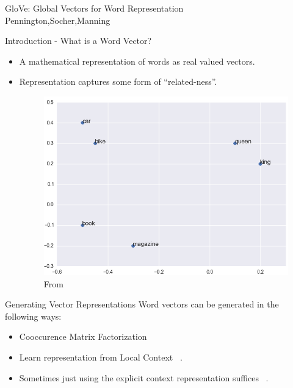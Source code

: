 \begin{frame}
  \begin{center}
    {
      \huge GloVe: Global Vectors for Word Representation
    } \\
    Pennington,Socher,Manning
  \end{center}
\end{frame}

\begin{frame}{Introduction - What is a Word Vector?}
  \begin{itemize}
  \item A mathematical representation of words as real valued vectors.
  \item Representation captures some form of ``related-ness''.
    \begin{figure}
      \includegraphics[scale=0.35]{images/wordvec.png}
      \caption{From}
    \end{figure}    
  \end{itemize}
\end{frame}


\begin{frame}{Generating Vector Representations}
  Word vectors can be generated in the following ways:
  \begin{itemize}[<+->]
  \item Cooccurence Matrix Factorization ~\cite{Deerwester}
  \item Learn representation from Local Context ~\cite{Mikolov13a}.
  \item Sometimes just using the explicit context representation suffices ~\cite{Levy14}.
  \end{itemize}
\end{frame}

